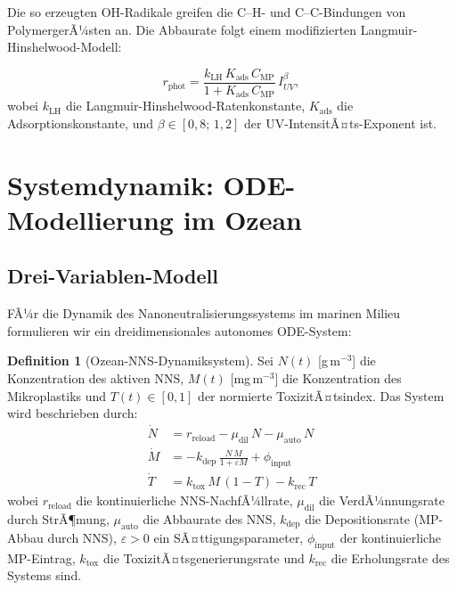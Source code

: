 ﻿\documentclass[12pt,a4paper]{article}
\theoremstyle{definition}
\newtheorem{definition}{Definition}[section]
\theoremstyle{remark}
\begin{document}
Die so erzeugten OH-Radikale greifen die C--H- und C--C-Bindungen von
PolymergerÃ¼sten an. Die Abbaurate folgt einem modifizierten Langmuir-Hinshelwood-Modell:

\begin{equation}
  r_{\text{phot}} = \frac{k_{\text{LH}}\,K_{\text{ads}}\,C_{\text{MP}}}
                        {1 + K_{\text{ads}}\,C_{\text{MP}}}\,I_{UV}^\beta,
  \label{eq:lh_model}
\end{equation}
wobei $k_{\text{LH}}$ die Langmuir-Hinshelwood-Ratenkonstante,
$K_{\text{ads}}$ die Adsorptionskonstante, und $\beta \in [0{,}8;\,1{,}2]$
der UV-IntensitÃ¤ts-Exponent ist.

\section{Systemdynamik: ODE-Modellierung im Ozean}
\label{sec:ode}

\subsection{Drei-Variablen-Modell}

FÃ¼r die Dynamik des Nanoneutralisierungssystems im marinen Milieu formulieren
wir ein dreidimensionales autonomes ODE-System:

\begin{definition}[Ozean-NNS-Dynamiksystem]
\label{def:ode_system}
Sei $N(t)$ [g\,m$^{-3}$] die Konzentration des aktiven NNS,
$M(t)$ [mg\,m$^{-3}$] die Konzentration des Mikroplastiks und
$T(t) \in [0,1]$ der normierte ToxizitÃ¤tsindex. Das System wird beschrieben durch:
\begin{align}
  \dot{N} &= r_{\text{reload}} - \mu_{\text{dil}}\,N - \mu_{\text{auto}}\,N
  \label{eq:ode_N}\\
  \dot{M} &= -k_{\text{dep}}\,\frac{N\,M}{1+\varepsilon M} + \phi_{\text{input}}
  \label{eq:ode_M}\\
  \dot{T} &= k_{\text{tox}}\,M\,(1-T) - k_{\text{rec}}\,T
  \label{eq:ode_T}
\end{align}
wobei $r_{\text{reload}}$ die kontinuierliche NNS-NachfÃ¼llrate,
$\mu_{\text{dil}}$ die VerdÃ¼nnungsrate durch StrÃ¶mung,
$\mu_{\text{auto}}$ die Abbaurate des NNS,
$k_{\text{dep}}$ die Depositionsrate (MP-Abbau durch NNS),
$\varepsilon > 0$ ein SÃ¤ttigungsparameter,
$\phi_{\text{input}}$ der kontinuierliche MP-Eintrag,
$k_{\text{tox}}$ die ToxizitÃ¤tsgenerierungsrate und
$k_{\text{rec}}$ die Erholungsrate des Systems sind.
\end{definition}
\end{document}
